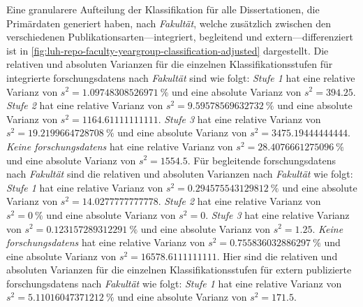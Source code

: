 Eine granularere Aufteilung der Klassifikation für alle Dissertationen, die Primärdaten generiert haben, nach \textit{Fakultät}, welche zusätzlich zwischen den verschiedenen Publikationsarten---integriert, begleitend und extern---differenziert ist in \cref{fig:luh-repo-faculty-yeargroup-classification-adjusted} dargestellt.
%
Die relativen und absoluten Varianzen für die einzelnen Klassifikationsstufen für integrierte \glspl{forschungsdaten} nach \textit{Fakultät} sind wie folgt:
\textit{Stufe 1} hat eine relative Varianz von $s^2=\SI[round-mode=places,round-precision=3]{1.09748308526971}{\percent}$ und eine absolute Varianz von $s^2=\num[round-mode=places,round-precision=3]{394.25}$.
\textit{Stufe 2} hat eine relative Varianz von $s^2=\SI[round-mode=places,round-precision=3]{9.59578569632732}{\percent}$ und eine absolute Varianz von $s^2=\num[round-mode=places,round-precision=3]{1164.61111111111}$.
\textit{Stufe 3} hat eine relative Varianz von $s^2=\SI[round-mode=places,round-precision=3]{19.2199664728708}{\percent}$ und eine absolute Varianz von $s^2=\num[round-mode=places,round-precision=3]{3475.19444444444}$.
\textit{Keine \glspl{forschungsdaten}} hat eine relative Varianz von $s^2=\SI[round-mode=places,round-precision=3]{28.4076661275096}{\percent}$ und eine absolute Varianz von $s^2=\num[round-mode=places,round-precision=3]{1554.5}$.
%
Für begleitende \glspl{forschungsdaten} nach \textit{Fakultät} sind die relativen und absoluten Varianzen nach \textit{Fakultät} wie folgt:
\textit{Stufe 1} hat eine relative Varianz von $s^2=\SI[round-mode=places,round-precision=3]{0.294575543129812}{\percent}$ und eine absolute Varianz von $s^2=\num[round-mode=places,round-precision=3]{14.0277777777778}$.
\textit{Stufe 2} hat eine relative Varianz von $s^2=\SI[round-mode=places,round-precision=3]{0}{\percent}$ und eine absolute Varianz von $s^2=\num[round-mode=places,round-precision=3]{0}$.
\textit{Stufe 3} hat eine relative Varianz von $s^2=\SI[round-mode=places,round-precision=3]{0.123157289312291}{\percent}$ und eine absolute Varianz von $s^2=\num[round-mode=places,round-precision=3]{1.25}$.
\textit{Keine \glspl{forschungsdaten}} hat eine relative Varianz von $s^2=\SI[round-mode=places,round-precision=3]{0.755836032886297}{\percent}$ und eine absolute Varianz von $s^2=\num[round-mode=places,round-precision=3]{16578.6111111111}$.
%
Hier sind die relativen und absoluten Varianzen für die einzelnen Klassifikationsstufen für extern publizierte \glspl{forschungsdaten} nach \textit{Fakultät} wie folgt:
\textit{Stufe 1} hat eine relative Varianz von $s^2=\SI[round-mode=places,round-precision=3]{5.11016047371212}{\percent}$ und eine absolute Varianz von $s^2=\num[round-mode=places,round-precision=3]{171.5}$.
